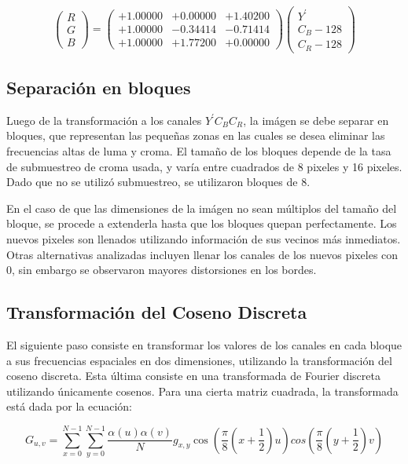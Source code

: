 \documentclass[%
final,
%
reprint,
%
notitlepage,
narroweqnarray,
inline,
twoside,
invited
]{ieee}
\begin{document}
\[
 \begin{pmatrix} R \\ G \\ B \end{pmatrix} = \begin{pmatrix} +1.00000 & +0.00000 & +1.40200 \\
+1.00000 & -0.34414 & -0.71414 \\
+1.00000& +1.77200 & +0.00000  \end{pmatrix}  \begin{pmatrix}Y^{'} \\ C_B - 128\\ C_R - 128\end{pmatrix}
\]


\subsection{Separación en bloques}

\par Luego de la transformación a los canales $Y^{'}C_BC_R$, la imágen se debe separar en bloques, que representan 
las pequeñas zonas en las cuales se desea eliminar las frecuencias altas de luma y croma. El tamaño de los bloques 
depende de la tasa de submuestreo de croma usada, y varía entre cuadrados de 8 pixeles y 16 pixeles. Dado que 
no se utilizó submuestreo, se utilizaron bloques de 8.
\par En el caso de que las dimensiones de la imágen no sean múltiplos del tamaño del bloque, se procede a extenderla 
hasta que los bloques quepan perfectamente. Los nuevos pixeles son llenados utilizando información de sus vecinos más 
inmediatos. Otras alternativas analizadas incluyen llenar los canales de los nuevos pixeles con 0, sin embargo se observaron 
mayores distorsiones en los bordes.

\subsection{Transformación del Coseno Discreta}

El siguiente paso consiste en transformar los valores de los canales en cada bloque a sus 
frecuencias espaciales en dos dimensiones, 
utilizando la transformación del coseno discreta. Esta última consiste en una transformada 
de Fourier discreta utilizando únicamente cosenos. Para una cierta matriz cuadrada, la transformada está 
dada por la ecuación:

\begin{equation}
	G_{u, v} = \sum^{N-1}_{x=0}\sum^{N-1}_{y=0}\frac{\alpha(u)\alpha(v)}{N}g_{x, y}\cos(\frac{\pi}{8}(x+\frac{1}{2})u)cos(\frac{\pi}{8}(y+\frac{1}{2})v)
\end{equation}
\end{document}
